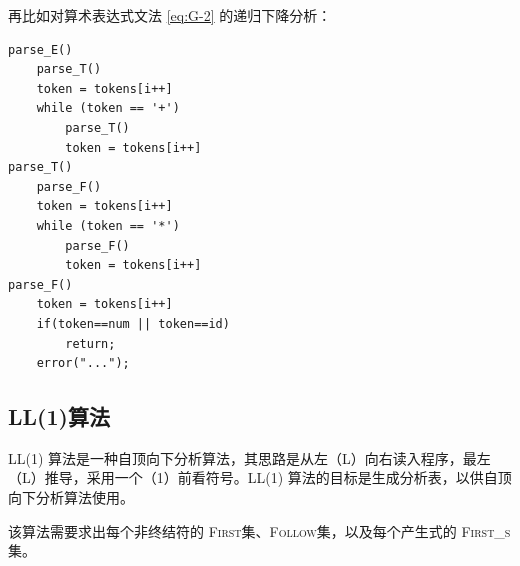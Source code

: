 \documentclass[UTF8]{ctexart}
\newcommand\FIRST{\textsc{First}}
\newcommand\FOLLOW{\textsc{Follow}}
\newcommand\FIRSTS{\textsc{First\_s}}
\newcommand\Emph[1]{\textcolor{cyan!80!black}{#1}}
\begin{document}
再比如对算术表达式文法 \eqref{eq:G-2} 的递归下降分析：
\begin{lstlisting}
parse_E()
    parse_T()
    token = tokens[i++]
    while (token == '+')
        parse_T()
        token = tokens[i++]
parse_T()
    parse_F()
    token = tokens[i++]
    while (token == '*')
        parse_F()
        token = tokens[i++]
parse_F()
    token = tokens[i++]
    if(token==num || token==id)
        return;
    error("...");
\end{lstlisting}


\subsection{LL(1)算法}\label{subsec:LL(1)}
\Emph{LL(1) 算法}是一种自顶向下分析算法，其思路是从左（L）向右读入程序，最左（L）推导，采用一个（1）前看符号。LL(1) 算法的目标是生成分析表，以供自顶向下分析算法使用。

该算法需要求出每个非终结符的 \FIRST 集、\FOLLOW 集，以及每个产生式的 \FIRSTS 集。
\end{document}
